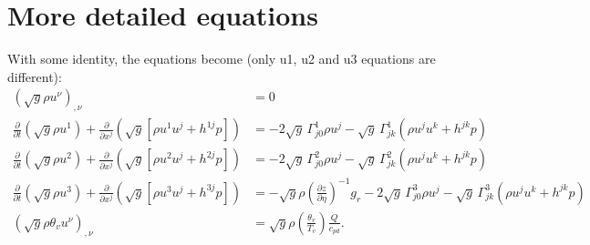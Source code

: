 \documentclass{article}
\begin{document}
\appendix

\section{More detailed equations}

With some identity, the equations become (only u1, u2 and u3 equations are different):
\begin{align}
\left( \sqrt{g}\rho u^\nu \right)_{,\nu} &= 0 \\
\label{eq:euler_u1}
\frac{\partial}{\partial t}\left( \sqrt{g}\rho u^1\right) 
        + \frac{\partial}{\partial x^j}\left( \sqrt{g}\left[\rho u^1u^j+h^{1j}p\right]\right)
    &= -2\sqrt{g} \, \Gamma^1_{j0} \rho u^j - \sqrt{g} \, \Gamma^1_{jk}\left(\rho u^ju^k+h^{jk}p\right) \\
\label{eq:euler_u2}
\frac{\partial}{\partial t}\left( \sqrt{g}\rho u^2\right)
        + \frac{\partial}{\partial x^j}\left( \sqrt{g}\left[\rho u^2u^j+h^{2j}p\right]\right)
    &= -2\sqrt{g} \, \Gamma^2_{j0} \rho u^j - \sqrt{g} \, \Gamma^2_{jk}\left(\rho u^ju^k+h^{jk}p\right) \\
\label{eq:euler_u3}
\frac{\partial}{\partial t}\left( \sqrt{g}\rho u^3\right)
        + \frac{\partial}{\partial x^j}\left( \sqrt{g}\left[\rho u^3 u^j + h^{3j}p\right]\right)
    &= - \sqrt{g} \rho \left(\frac{\partial z}{\partial \eta}\right)^{-1}
    g_r -2\sqrt{g} \, \Gamma^3_{j0} \rho u^j - \sqrt{g} \, \Gamma^3_{jk}\left(\rho u^ju^k+h^{jk}p\right) \\
\left( \sqrt{g}\rho \theta_v u^\nu \right)_{,\nu}
    &= \sqrt{g} \rho \left( \frac{\theta_v}{T_v} \right) \frac{\dot{Q}}{c_{pd}}
    \text{.}
\end{align}
\end{document}
